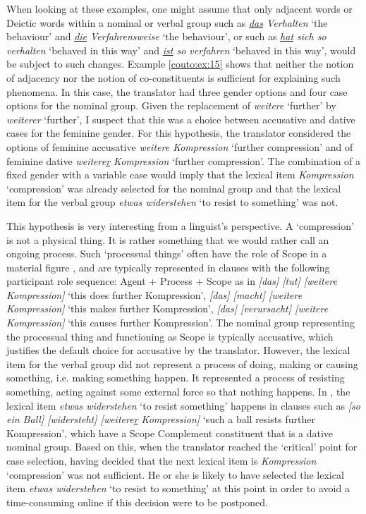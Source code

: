\documentclass[output=paper]{LSP/langsci}
\begin{document}
When looking at these examples, one might assume that only adjacent words or Deictic words within a nominal or verbal group such as \emph{\uline{das} Verhalten} `the behaviour' and \emph{\uline{die} Verfahrensweise} `the behaviour', or such as \emph{\uline{hat} sich so verhalten} `behaved in this way' and \emph{\uline{ist} so verfahren} `behaved in this way', would be subject to such changes. Example \ref{couto:ex:15} shows that neither the notion of adjacency nor the notion of co-constituents is sufficient for explaining such phenomena. In this case, the translator had three gender options and four case options for the nominal group. Given the replacement of \emph{weitere} `further' by \emph{weiterer} `further', I suspect that this was a choice between accusative and dative cases for the feminine gender. For this hypothesis, the translator considered the options of feminine accusative \emph{weitere Kompression} `further compression' and of feminine dative \emph{weitere\uline{r} Kompression} `further compression'. The combination of a fixed gender with a variable case would imply that the lexical item \emph{Kompression} `compression' was already selected for the nominal group and that the lexical item for the verbal group \emph{etwas widerstehen} `to resist to something' was not.

This hypothesis is very interesting from a linguist's perspective. A `compression' is not a physical thing. It is rather something that we would rather call an ongoing process. Such `processual things' often have the role of Scope in a material figure \citep[192]{Halliday:2004fe}, and are typically represented in clauses with the following participant role sequence: Agent + Process + Scope as in \emph{{[}das{]} {[}tut{]} {[}weitere Kompression{]}} `this does further Kompression', \emph{{[}das{]} {[}macht{]} {[}weitere Kompression{]}} `this makes further Kompression', \emph{{[}das{]} {[}verursacht{]} {[}weitere Kompression{]}} `this causes further Kompression'. The nominal group representing the processual thing and functioning as Scope is typically accusative, which justifies the default choice for accusative by the translator. However, the lexical item for the verbal group did not represent a process of doing, making or causing something, i.e. making something happen. It represented a process of resisting something, acting against some external force so that nothing happens. In , the lexical item \emph{etwas widerstehen} `to resist something' happens in clauses such as \emph{{[}so ein Ball{]} {[}widersteht{]} {[}weitere\uline{r} Kompression{]}} `such a ball resists further Kompression', which have a Scope Complement constituent that is a dative nominal group. Based on this, when the translator reached the `critical' point for case selection, having decided that the next lexical item is \emph{Kompression} `compression' was not sufficient. He or she is likely to have selected the lexical item \emph{etwas widerstehen} `to resist to something' at this point in order to avoid a time-consuming online  if this decision were to be postponed.
\end{document}
